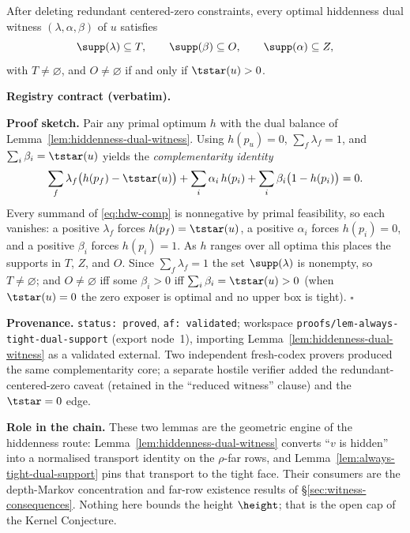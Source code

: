 \begin{lemma}\label{lem:always-tight-dual-support}
After deleting redundant centered-zero constraints, every optimal hiddenness dual witness
$(\lambda,\alpha,\beta)$ of $u$ satisfies
\[
  \supp(\lambda)\subseteq T,\qquad \supp(\beta)\subseteq O,\qquad \supp(\alpha)\subseteq Z,
\]
with $T\neq\varnothing$, and $O\neq\varnothing$ if and only if $\tstar(u)>0$.
\end{lemma}

\noindent\textbf{Registry contract (verbatim).}

\noindent\textbf{Proof sketch.} Pair any primal optimum $h$ with the dual balance of
Lemma~\ref{lem:hiddenness-dual-witness}. Using $h(p_u)=0$, $\sum_f\lambda_f=1$, and
$\sum_i\beta_i=\tstar(u)$ yields the \emph{complementarity identity}
\begin{equation}\label{eq:hdw-comp}
  \sum_{f}\lambda_f\bigl(h(p_f)-\tstar(u)\bigr)
  +\sum_i\alpha_i\,h(p_i)
  +\sum_i\beta_i\bigl(1-h(p_i)\bigr)=0 .
\end{equation}
Every summand of \eqref{eq:hdw-comp} is nonnegative by primal feasibility, so each vanishes: a positive
$\lambda_f$ forces $h(p_f)=\tstar(u)$, a positive $\alpha_i$ forces $h(p_i)=0$, and a positive
$\beta_i$ forces $h(p_i)=1$. As $h$ ranges over all optima this places the supports in $T$, $Z$, and
$O$. Since $\sum_f\lambda_f=1$ the set $\supp(\lambda)$ is nonempty, so $T\neq\varnothing$; and
$O\neq\varnothing$ iff some $\beta_i>0$ iff $\sum_i\beta_i=\tstar(u)>0$ (when $\tstar(u)=0$ the zero
exposer is optimal and no upper box is tight). \hfill$\square$

\noindent\textbf{Provenance.} \texttt{status: proved}, \texttt{af: validated}; workspace
\texttt{proofs/lem-always-tight-dual-support} (export node~1), importing
Lemma~\ref{lem:hiddenness-dual-witness} as a validated external. Two independent fresh-codex provers
produced the same complementarity core; a separate hostile verifier added the redundant-centered-zero
caveat (retained in the ``reduced witness'' clause) and the $\tstar=0$ edge.

\noindent\textbf{Role in the chain.} These two lemmas are the geometric engine of the hiddenness route:
Lemma~\ref{lem:hiddenness-dual-witness} converts ``$v$ is hidden'' into a normalised transport identity
on the $\rho$-far rows, and Lemma~\ref{lem:always-tight-dual-support} pins that transport to the tight
face. Their consumers are the depth-Markov concentration and far-row existence results of
\S\ref{sec:witness-consequences}. Nothing here bounds the height $\height$; that is the open cap of the
Kernel Conjecture.
